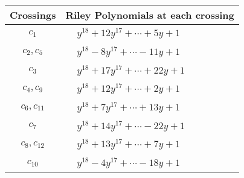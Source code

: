 \documentclass[1p]{elsarticle_modified}
\theoremstyle{definition}
\begin{document}
\begin{tabular}{m{50pt}|m{274pt}}
Crossings & \hspace{64pt}Riley Polynomials at each crossing \\
\hline $$\begin{aligned}c_{1}\end{aligned}$$&$\begin{aligned}
&y^{18}+12 y^{17}+\cdots+5 y+1
\end{aligned}$\\
\hline $$\begin{aligned}c_{2},c_{5}\end{aligned}$$&$\begin{aligned}
&y^{18}-8 y^{17}+\cdots-11 y+1
\end{aligned}$\\
\hline $$\begin{aligned}c_{3}\end{aligned}$$&$\begin{aligned}
&y^{18}+17 y^{17}+\cdots+22 y+1
\end{aligned}$\\
\hline $$\begin{aligned}c_{4},c_{9}\end{aligned}$$&$\begin{aligned}
&y^{18}+12 y^{17}+\cdots+2 y+1
\end{aligned}$\\
\hline $$\begin{aligned}c_{6},c_{11}\end{aligned}$$&$\begin{aligned}
&y^{18}+7 y^{17}+\cdots+13 y+1
\end{aligned}$\\
\hline $$\begin{aligned}c_{7}\end{aligned}$$&$\begin{aligned}
&y^{18}+14 y^{17}+\cdots-22 y+1
\end{aligned}$\\
\hline $$\begin{aligned}c_{8},c_{12}\end{aligned}$$&$\begin{aligned}
&y^{18}+13 y^{17}+\cdots+7 y+1
\end{aligned}$\\
\hline $$\begin{aligned}c_{10}\end{aligned}$$&$\begin{aligned}
&y^{18}-4 y^{17}+\cdots-18 y+1
\end{aligned}$\\
\hline
\end{tabular}\\~\\
\end{document}
